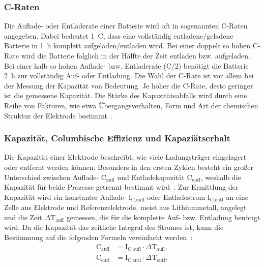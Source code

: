 \subsubsection*{C-Raten}
Die Auflade- oder Entladerate einer Batterie wird oft in sogenannten C-Raten angegeben. Dabei bedeutet 1~C, dass eine vollständig entladene/geladene Batterie in 1~h komplett aufgeladen/entladen wird. Bei einer doppelt so hohen C-Rate wird die Batterie folglich in der Hälfte der Zeit entladen bzw. aufgeladen. Bei einer halb so hohen Auflade- bzw. Entladerate (C/2) benötigt die Batterie 2~h zur vollständig Auf- oder Entladung. Die Wahl der C-Rate ist vor allem bei der Messung der Kapazität von Bedeutung. Je höher die C-Rate, desto geringer ist die gemessene Kapazität. Die Stärke des Kapazitätsabfalls wird durch eine Reihe von Faktoren, wie etwa Übergangsverhalten, Form und Art der chemischen Struktur der Elektrode bestimmt~\cite{Plett2015,Beard2019}.


\subsubsection*{Kapazität, Columbische Effizienz und Kapaziätserhalt}
Die Kapazität einer Elektrode beschreibt, wie viele Ladungsträger eingelagert oder entfernt werden können. Besonders in den ersten Zyklen besteht ein großer Unterschied zwischen Auflade- $\text{C}_{\text{aufl}}$ und Entladekapazität $\text{C}_{\text{entl}}$, weshalb die Kapazität für beide Prozesse getrennt bestimmt wird~\cite{Plett2015}.
Zur Ermittlung der Kapazität wird ein konstanter Auflade- $\text{I}_\text{C,aufl}$ oder Entladestrom $\text{I}_\text{C,entl}$ an eine Zelle aus Elektrode und Referenzelektrode, meist aus Lithiummetall, angelegt und die Zeit $\Delta \text{T}_\text{aufl}$ gemessen, die für die komplette Auf- bzw. Entladung benötigt wird. Da die Kapazität das zeitliche Integral des Stromes ist, kann die Bestimmung auf die folgenden Formeln vereinfacht werden~\cite{Newman2021}:
\begin{align}
	\text{C}_{\text{aufl}} &= \text{I}_\text{C,aufl} \cdot \Delta \text{T}_\text{aufl},\\
	\text{C}_{\text{entl}} &= \text{I}_\text{C,entl} \cdot \Delta \text{T}_\text{entl}.
\end{align}


